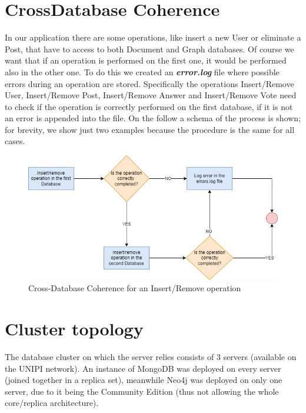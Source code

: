 \documentclass[11pt]{report}
\begin{document}
\section{Cross\-Database Coherence}
In our application there are some operations, like insert a new User or eliminate a Post, that have to access to both Document and Graph databases. Of course we want that if an operation is performed on the first one, it would be performed also in the other one. To do this we created an \textbf{\emph{error.log}} file where possible errors during an operation are stored. Specifically the operations Insert/Remove User, Insert/Remove Post, Insert/Remove Answer and Insert/Remove Vote need to check if the operation is correctly performed on the first database, if it is not an error is appended into the file. On the follow a schema of the process is shown; for brevity, we show just two examples because the procedure is the same for all cases.

\begin{figure}[ht]
  \centering
  \includegraphics[width=\textwidth,keepaspectratio=true]{img/Consistency.jpg}
  \caption{Cross-Database Coherence for an Insert/Remove operation}
\end{figure}

\newpage

\section{Cluster topology}
The database cluster on which the server relies consists of 3 servers (available on the UNIPI network). An instance of MongoDB was deployed on every server (joined together in a replica set), meanwhile Neo4j was deployed on only one server, due to it being the Community Edition (thus not allowing the whole core/replica architecture).
\end{document}
